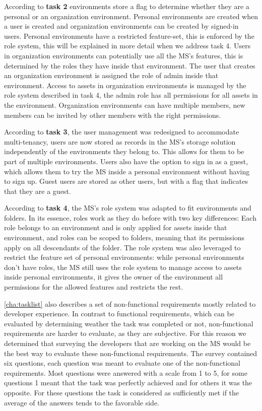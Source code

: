 According to \textbf{task 2} environments store a flag to determine whether they are a
personal or an organization environment.
Personal environments are created when a user is created and organization environments can
be created by signed-in users.
Personal environments have a restricted feature-set, this is enforced by the role
system, this will be explained in more detail when we address task 4.
Users in organization environments can potentially use all the MS's features, this is
determined by the roles they have inside that environment.
The user that creates an organization environment is assigned the role of admin inside
that environment.
Access to assets in organization environments is managed by the role system described in
task 4,
the admin role has all permissions for all assets in the environment.
Organization environments can have multiple members, new members can be invited by other
members with the right permissions.

According to \textbf{task 3}, the user management was redesigned to accommodate
multi-tenancy,
users are now stored as records in the MS's storage solution independently of the environments they belong to.
This allows for them to be part of multiple environments.
Users also have the option to sign in as a guest, which allows them to try the MS inside
a personal environment without having to sign up.
Guest users are stored as other users, but with a flag that indicates that they are a
guest.

According to \textbf{task 4}, the MS's role system was adapted to fit environments and
folders. In its essence, roles work as they do before with two key differences:
Each role belongs to an environment and is only applied for assets inside that
environment, and roles can be scoped to folders, meaning that its permissions apply on all
descendants of the folder.
The role system was also leveraged to restrict the feature set of personal environments:
while personal environments don't have roles, the MS still uses the role system to manage
access to assets inside personal environments, it gives the owner of the environment all
permissions for the allowed features and restricts the rest.

\ref{cha:tasklist} also describes a set of non-functional requirements mostly related to
developer experience.
In contrast to functional requirements, which can be evaluated by determining weather the
task was completed or not,
non-functional requirements are harder to evaluate, as they are subjective.
For this reason we determined that surveying the developers that are working on the MS
would be the best way to evaluate these non-functional requirements.
The survey contained six questions, each question was meant to evaluate one of the
non-functional requirements.
Most questions were answered with a scale from 1 to 5, for some questions 1 meant that the
task was perfectly achieved and for others it was the opposite.
For these questions the task is considered as sufficiently met if the average of the
answers tends to the favorable side.

